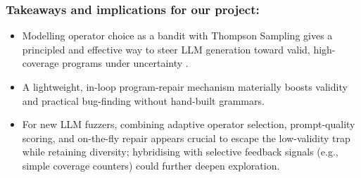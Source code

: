 \subsubsection{Takeaways and implications for our project:}

\begin{itemize}
    \item Modelling operator choice as a bandit with Thompson Sampling gives a principled and effective way to steer LLM generation toward valid, high-coverage programs under uncertainty \cite{lin_2025_lmfuzz,thompson_1933_on}.
    
    \item A lightweight, in-loop program-repair mechanism materially boosts validity and practical bug-finding without hand-built grammars.
    
    \item For new LLM fuzzers, combining adaptive operator selection, prompt-quality scoring, and on-the-fly repair appears crucial to escape the low-validity trap while retaining diversity; hybridising with selective feedback signals (e.g., simple coverage counters) could further deepen exploration.
\end{itemize}
